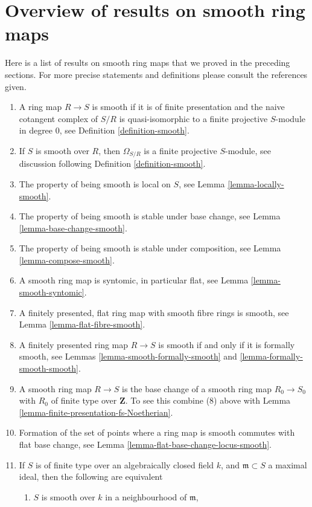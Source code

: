 \section{Overview of results on smooth ring maps}
\label{section-smooth-overview}

\noindent
Here is a list of results on smooth ring maps that we
proved in the preceding sections. For more precise statements
and definitions please consult the references given.
\begin{enumerate}
\item A ring map $R \to S$ is smooth if it is of finite presentation
and the naive cotangent complex of $S/R$ is quasi-isomorphic to
a finite projective $S$-module in degree $0$, see
Definition \ref{definition-smooth}.
\item If $S$ is smooth over $R$, then $\Omega_{S/R}$ is a finite projective
$S$-module, see discussion following Definition \ref{definition-smooth}.
\item The property of being smooth is local on $S$, see
Lemma \ref{lemma-locally-smooth}.
\item The property of being smooth is stable under base change, see
Lemma \ref{lemma-base-change-smooth}.
\item The property of being smooth is stable under composition, see
Lemma \ref{lemma-compose-smooth}.
\item A smooth ring map is syntomic, in particular flat, see
Lemma \ref{lemma-smooth-syntomic}.
\item A finitely presented, flat ring map with smooth fibre rings
is smooth, see Lemma \ref{lemma-flat-fibre-smooth}.
\item A finitely presented ring map $R \to S$ is smooth if and
only if it is formally smooth, see
Lemmas \ref{lemma-smooth-formally-smooth} and
\ref{lemma-formally-smooth-smooth}.
\item A smooth ring map $R \to S$ is the base change
of a smooth ring map $R_0 \to S_0$
with $R_0$ of finite type over $\mathbf{Z}$. To see this
combine (8) above with Lemma \ref{lemma-finite-presentation-fs-Noetherian}.
\item Formation of the set of points where a
ring map is smooth commutes with flat base change, see
Lemma \ref{lemma-flat-base-change-locus-smooth}.
\item If $S$ is of finite type over an algebraically closed
field $k$, and $\mathfrak m \subset S$ a maximal ideal,
then the following are equivalent
\begin{enumerate}
\item $S$ is smooth over $k$ in a neighbourhood of $\mathfrak m$,

\end{enumerate}
\end{enumerate}
